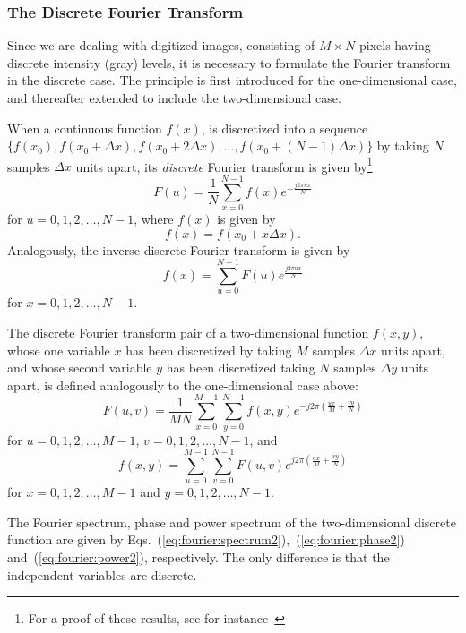 \subsubsection{The Discrete Fourier Transform}

Since we are dealing with digitized images, consisting of $M\times N$
pixels having discrete intensity (gray) levels, it is necessary to
formulate the Fourier transform in the discrete case.  The principle
is first introduced for the one-dimensional case, and thereafter
extended to include the two-dimensional case.

When a continuous function $f(x)$, is discretized into a sequence
$\{f(x_{0}),f(x_{0}+\Delta x),f(x_{0}+2\Delta x),\ldots,
f(x_{0}+(N-1)\Delta x)\}$ by taking $N$ samples $\Delta x$ units
apart, its {\em discrete\/} Fourier transform is given by\footnote{For
  a proof of these results, see for instance~\cite{brigham}}
\begin{equation}
\label{eq:fourier:discrete}
  F(u)=\frac{1}{N}\sum_{x=0}^{N-1}f(x)e^{-\frac{j2\pi ux}{N}}
\end{equation}
for $u=0,1,2,\ldots,N-1$, where $f(x)$ is given by
\begin{equation}
  f(x)=f(x_{0}+x\Delta x)\mbox{.}
\end{equation}
Analogously, the inverse discrete Fourier transform is given by
\begin{equation}
\label{eq:fourier:discrete:inverse}
  f(x)=\sum_{u=0}^{N-1}F(u)e^{\frac{j2\pi ux}{N}}
\end{equation}
for $x=0,1,2,\ldots,N-1$.

The discrete Fourier transform pair of a two-dimensional function
$f(x,y)$, whose one variable $x$ has been discretized by taking $M$
samples $\Delta x$ units apart, and whose second variable $y$ has been
discretized taking $N$ samples $\Delta y$ units apart, is defined
analogously to the one-dimensional case above:
\begin{equation}
  F(u,v)=\frac{1}{MN}\sum_{x=0}^{M-1}\sum_{y=0}^{N-1}f(x,y)e^{-j2\pi
    (\frac{ux}{M}+\frac{vy}{N})} 
\end{equation}
for $u=0,1,2,\ldots,M-1$, $v=0,1,2,\ldots,N-1$, and
\begin{equation}
  f(x,y)=\sum_{u=0}^{M-1}\sum_{v=0}^{N-1}F(u,v)e^{j2\pi
    (\frac{ux}{M}+\frac{vy}{N})} 
\end{equation}
for $x=0,1,2,\ldots,M-1$ and $y=0,1,2,\ldots,N-1$.

The Fourier spectrum, phase and power spectrum of the two-dimensional
discrete function are given by
Eqs.~(\ref{eq:fourier:spectrum2}),~(\ref{eq:fourier:phase2})
and~(\ref{eq:fourier:power2}), respectively.  The only difference is
that the independent variables are discrete.

